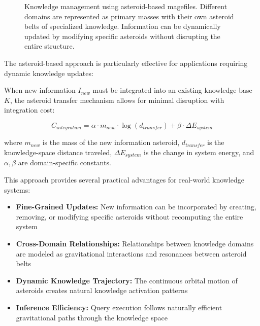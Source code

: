 \begin{figure}[h]
\caption{Knowledge management using asteroid-based magefiles. Different domains are represented as primary masses with their own asteroid belts of specialized knowledge. Information can be dynamically updated by modifying specific asteroids without disrupting the entire structure.}
\label{fig:asteroid_knowledge}
\end{figure}

The asteroid-based approach is particularly effective for applications requiring dynamic knowledge updates:

\begin{theorem}
When new information $I_{new}$ must be integrated into an existing knowledge base $K$, the asteroid transfer mechanism allows for minimal disruption with integration cost:

\begin{equation}
C_{integration} = \alpha \cdot m_{new} \cdot \log(d_{transfer}) + \beta \cdot \Delta E_{system}
\end{equation}

where $m_{new}$ is the mass of the new information asteroid, $d_{transfer}$ is the knowledge-space distance traveled, $\Delta E_{system}$ is the change in system energy, and $\alpha, \beta$ are domain-specific constants.
\end{theorem}

This approach provides several practical advantages for real-world knowledge systems:

\begin{itemize}
    \item \textbf{Fine-Grained Updates:} New information can be incorporated by creating, removing, or modifying specific asteroids without recomputing the entire system
    \item \textbf{Cross-Domain Relationships:} Relationships between knowledge domains are modeled as gravitational interactions and resonances between asteroid belts
    \item \textbf{Dynamic Knowledge Trajectory:} The continuous orbital motion of asteroids creates natural knowledge activation patterns
    \item \textbf{Inference Efficiency:} Query execution follows naturally efficient gravitational paths through the knowledge space
\end{itemize}

